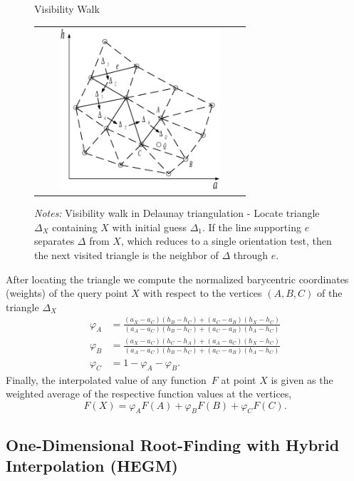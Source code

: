 \documentclass[a4paper,12pt]{article}
\begin{document}
\begin{figure}[htbp]
	\caption{Visibility Walk}
	\label{fig:visibility_walk}
	\centering
	\begin{tabular}{c}
	\includegraphics[height=6.0cm, width=7.5cm]{Abbildungen/visibility_walk_2.eps}  \\
	\end{tabular}
	\caption*{\footnotesize{\emph{Notes:} Visibility walk in Delaunay triangulation - Locate triangle $\Delta_{X}$ containing $X$ with initial guess $\Delta_{1}$. If the line supporting $e$ separates $\Delta$ from $X$, which reduces to a single orientation test, then the next visited triangle is the neighbor of $\Delta$ through $e$.}}
\end{figure}

After locating the triangle we compute the normalized barycentric coordinates (weights) of the query point $X$ with respect to the vertices $(A,B,C)$ of the triangle $\Delta_{X}$
\begin{align*}
	\varphi_{A}  &  = \frac{\left(a_{X} - a_{C}\right) \left(h_{B} - h_{C}\right) + \left(a_{C} - a_{B}\right) \left(h_{X} - h_{C}\right)} {\left(a_{A} - a_{C}\right) \left(h_{B} - h_{C}\right) +\left(a_{C} - a_{B}\right) \left(h_{A} - h_{C}\right)}  \\
	\varphi_{B}  &  = \frac{\left(a_{X} - a_{C}\right) \left(h_{C} - h_{A}\right) + \left(a_{A} - a_{C}\right) \left(h_{X} - h_{C}\right)} {\left(a_{A} - a_{C}\right) \left(h_{B} - h_{C}\right) +\left(a_{C} - a_{B}\right) \left(h_{A} - h_{C}\right)}  \\
	\varphi_{C}  &  = 1 - \varphi_{A} - \varphi_{B}.
\end{align*}
Finally, the interpolated value of any function~$F$ at point $X$ is given as the weighted average of the respective function values at the vertices,
\[
	F\left(X\right) = \varphi_{A} F(A) + \varphi_{B} F(B) + \varphi_{C} F(C).
\]

\subsection{One-Dimensional Root-Finding with Hybrid Interpolation (HEGM)}
\end{document}
